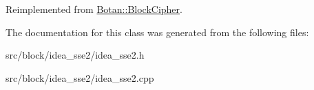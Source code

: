 Reimplemented from \hyperlink{classBotan_1_1BlockCipher_a635a1c3ed1084be78cf1b9e655ab1465}{Botan\-::\-Block\-Cipher}.



The documentation for this class was generated from the following files\-:\begin{DoxyCompactItemize}
\item 
src/block/idea\-\_\-sse2/idea\-\_\-sse2.\-h\item 
src/block/idea\-\_\-sse2/idea\-\_\-sse2.\-cpp\end{DoxyCompactItemize}
